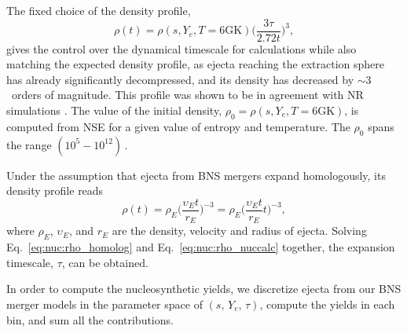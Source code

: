 The fixed choice of the density profile,
\begin{equation}
\rho(t) = \rho(s, Y_e, T=6\text{GK})\Big(\frac{3\tau}{2.72 t}\Big)^3, 
\label{eq:nuc:rho_nuccalc}
\end{equation}
gives the control over the dynamical timescale for \rproc{} calculations 
while also matching the expected density profile, 
as ejecta reaching the extraction sphere has already 
significantly decompressed, and its density has decreased 
by ${\sim}3$~orders of magnitude. 
%
This profile was shown to be in agreement with \ac{NR} simulations 
\citep{Lippuner:2015gwa,Foucart:2014nda}. 
%
The value of the initial density, 
$\rho_0 = \rho(s, Y_e, T=6\text{GK})$, 
is computed from \ac{NSE} for a given value of entropy and 
temperature. 
The $\rho_0$ spans the range $(10^5 - 10^{12})\,$\gcm.
%

Under the assumption that ejecta from \ac{BNS} mergers expand homologously, 
its density profile reads
%
\begin{equation}
\rho(t) = \rho_E\Big(\frac{\upsilon_E t}{r_E}\Big)^{-3} = 
\rho_E\Big(\frac{\upsilon_E t}{r_E}t\Big)^{-3},
\label{eq:nuc:rho_homolog}
\end{equation}
%
where $\rho_E$, $\upsilon_E$, and $r_E$ are the density, velocity and radius of 
ejecta. 
%
Solving Eq.~\eqref{eq:nuc:rho_homolog} and Eq.~\eqref{eq:nuc:rho_nuccalc} together,
the expansion timescale, $\tau$, can be obtained.


In order to compute the nucleosynthetic yields, we discretize  ejecta from our \ac{BNS} 
merger models in the parameter space of $(s, \, Y_e,\, \tau)$, compute the yields 
in each bin, and sum all the contributions.
%

